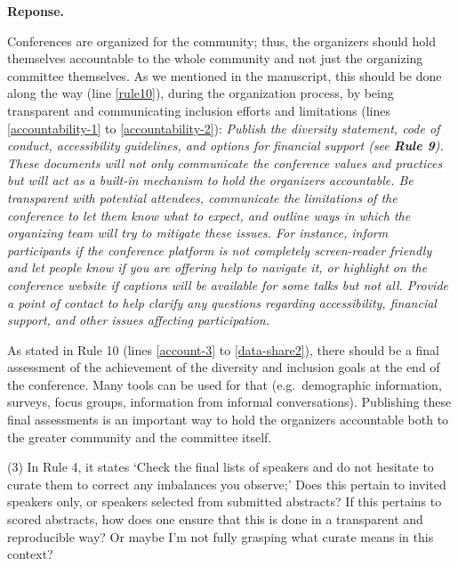 \documentclass{article}
\newenvironment{Reply}{\noindent\color{BlueViolet}\textbf{Reponse.}}{\vspace{1em}}
\begin{document}
\begin{Reply}

Conferences are organized for the community; thus, the organizers should hold themselves accountable to the whole community and not just the organizing committee themselves.
As we mentioned in the manuscript, this should be done along the way (line \ref{rule10}), during the organization process, by being transparent and communicating inclusion efforts and limitations (lines \ref{accountability-1} to \ref{accountability-2}):
\textit{Publish the diversity statement, code of conduct, accessibility guidelines, and options for financial support (see \textbf{Rule 9}).
These documents will not only communicate the conference values and practices but will act as a built-in mechanism to hold the organizers accountable.
Be transparent with potential attendees, communicate the limitations of the conference to let them know what to expect, and outline ways in which the organizing team will try to mitigate these issues. 
For instance, inform participants if the conference platform is not completely screen-reader friendly and let people know if you are offering help to navigate it, or highlight on the conference website if captions will be available for some talks but not all.
Provide a point of contact to help clarify any questions regarding accessibility, financial support, and other issues affecting participation.}

As stated in Rule 10 (lines \ref{account-3} to \ref{data-share2}), there should be a final assessment of the achievement of the diversity and inclusion goals at the end of the conference. Many tools can be used for that (e.g.\ demographic information, surveys, focus groups, information from informal conversations). 
Publishing these final assessments is an important way to hold the organizers accountable both to the greater community and the committee itself.
\end{Reply}

(3) In Rule 4, it states `Check the final lists of speakers and do not hesitate to curate them to correct any imbalances you observe;' Does this pertain to invited speakers only, or speakers selected from submitted abstracts? If this pertains to scored abstracts, how does one ensure that this is done in a transparent and reproducible way? Or maybe I'm not fully grasping what curate means in this context?
\end{document}
